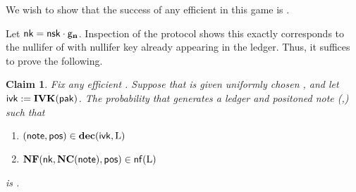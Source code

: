 \documentclass[11pt]{article}
\numberwithin{equation}{section} %
\numberwithin{figure}{section} %
\newtheorem{claim}[thm]{Claim}
\begin{document}
We wish to show that the success of any efficient \adv in this game is \negl.


Let $\mathsf{nk} =\mathsf{nsk}\cdot\mathsf{g}_{\mathbf{n}}$.
Inspection of the protocol shows this exactly corresponds to the nullifer of \note with nullifer key \nk already appearing in the ledger.
Thus, it suffices to prove the following.
\begin{claim}\label{sapling-spendability}
 Fix any efficient \adv.
 Suppose that \adv  is given uniformly chosen \pak, and let $\mathsf{ivk} := \mathbf{IVK}(\mathsf{pak})$.
The probability that \adv generates a ledger \ledger and positoned note (\note,\pos) such that 
 \begin{enumerate}
  \item $(\mathsf{note},\mathsf{pos})\in \mathsf{\mathbf{dec}}(\mathsf{ivk},\mathrm{L})$
  \item $\mathbf{NF}(\mathsf{nk},\mathbf{NC}(\mathsf{note}),\mathsf{pos})\in \mathsf{nf}(\mathrm{L})$ 
 \end{enumerate}
 is \negl.
\end{claim}
\end{document}
